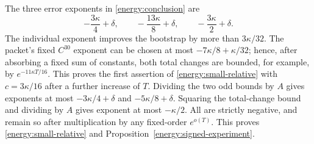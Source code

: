 The three error exponents in \eqref{energy:conclusion} are
\[
 -\frac{3\kappa}{4}+\delta,
 \qquad-\frac{13\kappa}{8}+\delta,
 \qquad-\frac{3\kappa}{2}+\delta.
\]
The individual exponent improves the bootstrap by more than
\(3\kappa/32\). The packet's fixed \(C^{30}\) exponent can be
chosen at most \(-7\kappa/8+\kappa/32\); hence, after absorbing a
fixed sum of constants, both total changes are bounded, for example,
by \(e^{-11\kappa T/16}\). This proves the first assertion of
\eqref{energy:small-relative} with \(c=3\kappa/16\) after a further
increase of \(T\). Dividing the two odd bounds by \(A\) gives
exponents at most \(-3\kappa/4+\delta\) and
\(-5\kappa/8+\delta\). Squaring the total-change bound and dividing
by \(A\) gives exponent at most \(-\kappa/2\). All are strictly
negative, and remain so after multiplication by any fixed-order
\(e^{o(T)}\). This proves \eqref{energy:small-relative} and
Proposition~\ref{energy:signed-experiment}.
